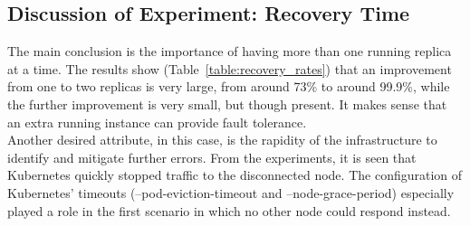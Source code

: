 \subsection*{Discussion of Experiment: Recovery Time}
The main conclusion is the importance of having more than one running replica at a time. The results show (Table~\ref{table:recovery_rates}) that an improvement from one to two replicas is very large, from around 73\% to around 99.9\%, while the further improvement is very small, but though present. It makes sense that an extra running instance can provide fault tolerance. \\

\noindent
Another desired attribute, in this case, is the rapidity of the infrastructure to identify and mitigate further errors. From the experiments, it is seen that Kubernetes quickly stopped traffic to the disconnected node. The configuration of Kubernetes' timeouts (--pod-eviction-timeout and --node-grace-period) especially played a role in the first scenario in which no other node could respond instead. \\


%
%
%
%
%
%
